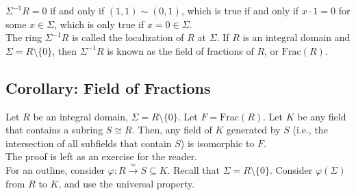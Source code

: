 \documentclass[10pt]{extarticle}
\begin{document}
  $\Sigma^{-1}R = 0$ if and only if $(1,1)\sim (0,1)$, which is true if and only if $x\cdot 1 = 0$ for some $x\in \Sigma$, which is only true if $x = 0\in \Sigma$.\\

  The ring $\Sigma^{-1}R$ is called the localization of $R$ at $\Sigma$. If $R$ is an integral domain and $\Sigma = R\setminus \{0\}$, then $\Sigma^{-1}R$ is known as the field of fractions of $R$, or $\text{Frac}(R)$.
  \subsection{Corollary: Field of Fractions}%
  Let $R$ be an integral domain, $\Sigma = R\setminus \{0\}$. Let $F = \text{Frac}(R)$. Let $K$ be any field that contains a subring $S\cong R$. Then, any field of $K$ generated by $S$ (i.e., the intersection of all subfields that contain $S$) is isomorphic to $F$.\\

  The proof is left as an exercise for the reader.\\

  For an outline, consider $\varphi: R\xrightarrow{\simeq} S\subseteq K$. Recall that $\Sigma = R\setminus \{0\}$. Consider $\varphi(\Sigma)$ from $R$ to $K$, and use the universal property.
\end{document}
